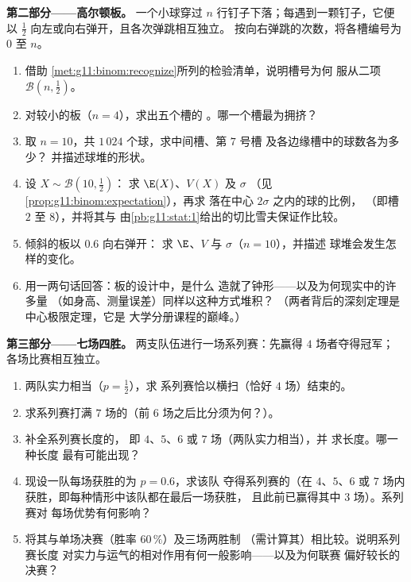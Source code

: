 \begin{problem}
\medskip
\noindent\textbf{第二部分——高尔顿板。}
一个小球穿过 $n$ 行钉子下落；每遇到一颗钉子，它便
以 $\frac12$ 向左或向右弹开，且各次弹跳相互独立。
按向右弹跳的次数，将各槽编号为 $0$ 至 $n$。
\begin{enumerate}[resume]
  \item 借助
        \cref{met:g11:binom:recognize}所列的检验清单，说明槽号为何
        服从二项
        $\mathcal B\!\left(n, \frac12\right)$。
  \item 对较小的板（$n = 4$），求出五个槽的
        。哪一个槽最为拥挤？
  \item 取 $n = 10$，共 $1\,024$ 个球，求中间槽、第 $7$ 号槽
        及各边缘槽中的\emph{}球数各为多少？
        并描述球堆的形状。
  \item 设 $X \sim \mathcal B\!\left(10, \frac12\right)$：
        求 $\E(X)$、$V(X)$ 及 $\sigma$
        （见\cref{prop:g11:binom:expectation}），再求
        落在中心 $2\sigma$ 之内的球的比例，
        （即槽 $2$ 至 $8$），并将其与
        由\cref{pb:g11:stat:1}给出的切比雪夫保证作比较。
  \item 倾斜的板以 $0.6$ 向右弹开：
        求 $\E$、$V$ 与 $\sigma$（$n = 10$），并描述
        球堆会发生怎样的变化。
  \item 用一两句话回答：板的设计中，是什么
        造就了钟形——以及为何现实中的许多量
        （如身高、测量误差）同样以这种方式堆积？
        （两者背后的深刻定理是
        中心极限定理，它是
        大学分册课程的巅峰。）
\end{enumerate}

\medskip
\noindent\textbf{第三部分——七场四胜。}
两支队伍进行一场系列赛：先赢得 $4$ 场者夺得冠军；
各场比赛相互独立。
\begin{enumerate}[resume]
  \item 两队实力相当（$p = \frac12$），求
        系列赛恰以横扫（恰好 $4$ 场）结束的。
  \item 求系列赛打满
        $7$ 场的（前 $6$ 场之后比分须为何？）。
  \item 补全系列赛长度的，
        即 $4$、$5$、$6$ 或 $7$ 场（两队实力相当），并
        求长度。哪一种长度
        最有可能出现？
  \item 现设一队每场获胜的为 $p = 0.6$，求该队
        夺得系列赛的（在 $4$、$5$、$6$
        或 $7$ 场内获胜，即每种情形中该队都在最后一场获胜，
        且此前已赢得其中 $3$ 场）。系列赛对
        每场优势有何影响？
  \item 将其与单场决赛（胜率 $60\,\%$）及三场两胜制
        （需计算其）相比较。说明系列赛长度
        对实力与运气的相对作用有何一般影响——以及为何联赛
        偏好较长的决赛？
\end{enumerate}


\end{problem}
